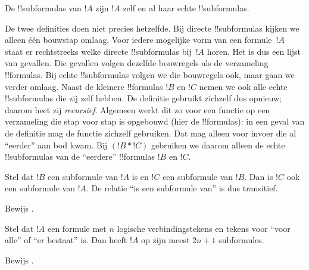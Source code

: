 \documentclass[../../../include/open-logic-section]{subfiles}
\begin{document}
\begin{defn}[!!^{subformula}]
De !!{subformula}s van $!A$ zijn $!A$ zelf en al haar echte
!!{subformula}s.
\end{defn}

\begin{explain}
De twee definities doen niet precies hetzelfde. Bij directe
!!{subformula}s kijken we alleen één bouwstap omlaag. Voor iedere
mogelijke vorm van een formule~$!A$ staat er rechtstreeks welke
directe !!{subformula}s bij~$!A$ horen. Het is dus een lijst van
gevallen. Die gevallen volgen dezelfde bouwregels als de verzameling
!!{formula}s. Bij echte !!{subformula}s volgen we die bouwregels ook,
maar gaan we verder omlaag. Naast de kleinere !!{formula}s $!B$ en
$!C$ nemen we ook alle echte !!{subformula}s die zij zelf hebben. De
definitie gebruikt zichzelf dus opnieuw; daarom heet zij
\emph{recursief}. Algemeen werkt dit zo voor een functie op een
verzameling die stap voor stap is opgebouwd (hier de !!{formula}s): in
een geval van de definitie mag de functie zichzelf gebruiken. Dat mag
alleen voor invoer die al ``eerder'' aan bod kwam. Bij $(!B \ast !C)$
gebruiken we daarom alleen de echte !!{subformula}s van de ``eerdere''
!!{formula}s $!B$ en $!C$.
\end{explain}

\begin{prop}
Stel dat $!B$ een subformule van $!A$ is en $!C$ een subformule van
$!B$. Dan is $!C$ ook een subformule van $!A$. De relatie ``is een
subformule van'' is dus transitief.
\end{prop}

\begin{prob}
Bewijs .
\end{prob}

\begin{prop}
Stel dat $!A$ een formule met $n$ logische verbindingstekens en tekens
voor ``voor alle'' of ``er bestaat'' is. Dan heeft $!A$ op zijn meest
$2n+1$ subformules.
\end{prop}

\begin{prob}
Bewijs .
\end{prob}
\end{document}
